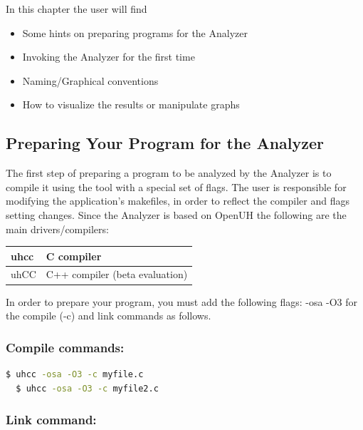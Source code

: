 In this chapter the user will find

\begin{itemize}
\item Some hints on preparing programs for the \openshmem Analyzer
\item Invoking the \openshmem Analyzer for the first time
\item Naming/Graphical conventions
\item How to visualize the results or manipulate graphs
\end{itemize}

\subsection{Preparing Your Program for the \openshmem Analyzer}

The first step of preparing a program to be analyzed by the \openshmem
Analyzer is to compile it using the tool with a special set of
flags. The user is responsible for modifying the application's
makefiles, in order to reflect the compiler and flags setting
changes. Since the \openshmem Analyzer is based on OpenUH the
following are the main drivers/compilers:

\vspace{0.1in}

\begin{center}
  \begin{tabular}{|l | l |}
    \hline
    uhcc & C compiler \\
    \hline
    uhCC & C++ compiler (beta evaluation) \\
    \hline
  \end{tabular}
\end{center}

\vspace{0.1in}

In order to prepare your program, you must add the following flags:
-osa -O3 for the compile (-c) and link commands as follows.

\subsubsection*{Compile commands:}

\begin{lstlisting}[language=bash]
  $ uhcc -osa -O3 -c myfile.c
  $ uhcc -osa -O3 -c myfile2.c
\end{lstlisting}

\subsubsection*{Link command:}

